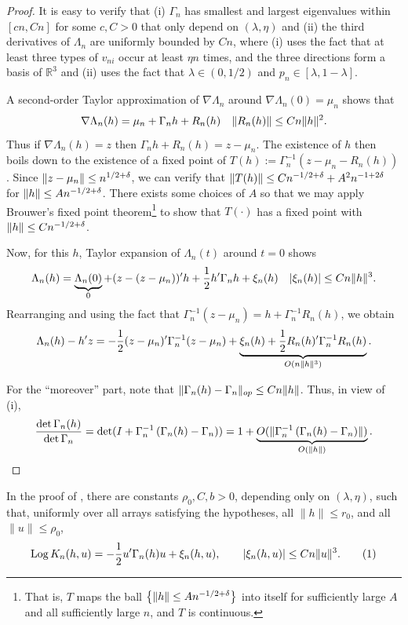 \documentclass[12pt,reqno]{amsart}
\DeclareMathOperator{\Log}{Log} %
\begin{document}
\begin{proof} It is easy to verify that (i) $\Gamma_n$ has smallest and largest
 eigenvalues within $[cn, Cn]$
 for some $c,C > 0$ that only depend on $(\lambda, \eta)$
 and (ii) the third derivatives of $\Lambda_n$ are uniformly
 bounded by $Cn$, where (i) uses the fact that at least three types of $v_{ni}$ occur at
 least $\eta n$ times, and the three directions form a basis of $\mathbb R^3$ and
 (ii) uses the fact that $\lambda \in (0,1/2)$ and $p_n \in [\lambda, 1-\lambda]$.


A second-order Taylor approximation of $\nabla \Lambda_n$
around $\nabla\Lambda_n
(0) = \mu_n$ shows
that \[
	\nabla \Lambda_n(h) = \mu_n + \Gamma_n h + R_n(h) \quad \lVert R_n(h)\rVert \le Cn
	\lVert h\rVert^2.
\]
Thus if $\nabla \Lambda_n(h) = z$ then $ \Gamma_n h + R_n(h) = z - \mu_n.$ The
 existence of $h$ then boils down to the existence of a fixed point of \( T
 (h) := \Gamma_n^{-1} (z - \mu_n - R_n(h)) \).
 Since $\lVert z- \mu_n\rVert \le n^
 {1/2+\delta}$, we can verify that $\lVert T(h)\rVert \le Cn^{-1/2 + \delta} + A^2 n^
 {-1+2\delta}$ for $\lVert h\rVert \le A n^{-1/2+\delta}$.
 There exists some choices of $A$ so
 that we may apply Brouwer's fixed point theorem\footnote{That is, $T$ maps the ball
 $\left\{{\lVert h\rVert \le A n^{-1/2+\delta}}\right\}$ into itself for sufficiently large $A$ and all
 sufficiently large $n$,
 and $T$ is continuous. } to show that $T (\cdot)$ has a fixed
 point with $\lVert h\rVert \le C n^{-1/2 + \delta}$.

	Now, for this $h$, Taylor expansion of $\Lambda_n(t)$ around $t=0$ shows \[
		\Lambda_n(h) = \underbrace{\Lambda_n(0)}_{0} + (z - (z-\mu_n))'h + \frac12 h'
		\Gamma_n h +
		\xi_n (h) \quad |\xi_n
		(h) |  \le  Cn \lVert h\rVert^3.
	\]
	Rearranging and using the fact that $\Gamma_n^{-1} (z-\mu_n) = h + \Gamma_n^{-1} R_n(h)$,
	we obtain \[
		\Lambda_n(h) - h'z = -\frac{1}{2} (z-\mu_n)'\Gamma_n^{-1} (z-\mu_n) +
		\underbrace{\xi_n (h) +
				\frac{1}{2} R_n(h)' \Gamma_n^{-1} R_n(h)}_{O(n\lVert h\rVert^3)}.
	\]

	For the ``moreover'' part, note that \(
		\lVert\Gamma_n(h) - \Gamma_n\rVert_{op} \le C n \lVert h\rVert
	\).
	Thus, in view of (i), \[
		\frac{\det \Gamma_n(h)}{\det \Gamma_n} = \det(I + \Gamma_n^{-1}\left(\Gamma_n(h) -
		\Gamma_n\right)) = 1 + \underbrace{O(\lVert\Gamma_n^{-1}\left(\Gamma_n(h) -
				\Gamma_n\right)\rVert)}_{O(\lVert h\rVert)}.\qedhere
	\]
\end{proof}

\begin{lem}\label{lem:K-small-frequency}
In the proof of , there are constants \(\rho_0,C,b>0\), depending only on
\((\lambda,\eta)\), such that, uniformly over all arrays satisfying the
hypotheses, all \(\|h\|\le r_0\), and all \(\|u\|\le\rho_0\),
\[\Log K_n(h,u) = -\frac12u'\Gamma_n(h)u+\xi_n(h,u),
\qquad
|\xi_n(h,u)|\le Cn\|u\|^3.
\numberthis \label{eq:logKexpansion}
\]
\end{lem}
\end{document}
